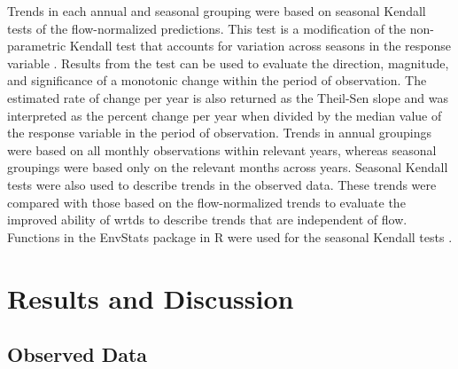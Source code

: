 \documentclass[journal = esthag, manuscript = article]{achemso}\usepackage[]{graphicx}\usepackage[]{color}
\begin{document}
Trends in each annual and seasonal grouping were based on seasonal Kendall tests of the flow-normalized predictions. This test is a modification of the non-parametric Kendall test that accounts for variation across seasons in the response variable \cite{Hirsch82}.  Results from the test can be used to evaluate the direction, magnitude, and significance of a monotonic change within the period of observation.  The estimated rate of change per year is also returned as the Theil-Sen slope and was interpreted as the percent change per year when divided by the median value of the response variable in the period of observation.\cite{Jassby08}  Trends in annual groupings were based on all monthly observations within relevant years, whereas seasonal groupings were based only on the relevant months across years.  Seasonal Kendall tests were also used to describe trends in the observed data.  These trends were compared with those based on the flow-normalized trends to evaluate the improved ability of \ac{wrtds} to describe trends that are independent of flow.  Functions in the EnvStats package in R were used for the seasonal Kendall tests \cite{Millard13}. 

\section{Results and Discussion}

\subsection{Observed Data}

\end{document}

